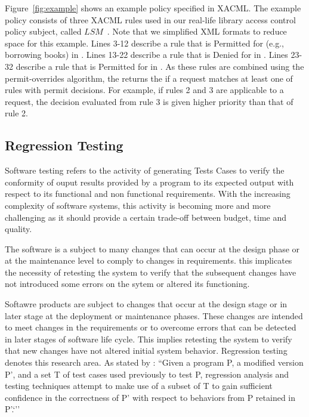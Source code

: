 Figure~\ref{fig:example} shows an example policy specified
in XACML. The example policy consists of three XACML rules used in our real-life library access
control policy subject, called $LSM$~\cite{mouelhi09:tranforming}.
Note that we simplified XML formats to reduce
space for this example.
Lines 3-12 describe a rule that  is Permitted for   (e.g., borrowing books) in .
Lines 13-22 describe
a rule that  is Denied for   in .
Lines 23-32 describe
a rule that  is Permitted for   in .
As these rules are combined using the permit-overrides
algorithm, the  returns the
 if a request matches at least one of
rules with permit decisions. For example, if rules 2 and 3 are applicable to a request, the decision
evaluated from rule 3 is given higher priority than that of rule 2.


\subsection{Regression Testing}
Software testing \cite{Myers:1979:AST:539883} refers to the activity of generating Tests Cases to verify the conformity of ouput results provided by a program to its expected 
output with respect to its functional and non functional requirements. With the increasing complexity of software systems, this activity is becoming more and more challenging as it 
should provide a certain trade-off between budget, time and quality.

The software is a subject to many changes that can occur at the design phase or at the maintenance level to comply to changes in requirements.
this implicates the necessity of retesting the system to verify that the subsequent changes have not introduced some errors on the sytem or altered its functioning.

Softawre products are subject to changes that occur at the design stage or in later stage at the deployment or maintenance phases. These changes are intended to meet changes
 in the requirements or to overcome errors that can be detected in later stages of software life cycle. This implies retesting the system to verify that new changes have not altered 
initial system behavior. Regression testing denotes this research area. As stated by \cite{Rothermel:1996:ART:235681.235682}:
``Given a program P, a modified version P', and a set T of test cases used previously to test P, regression analysis and testing techniques attempt
to make use of a subset of T to gain sufficient confidence in the correctness of P' with respect to behaviors from P retained in P'.`''

